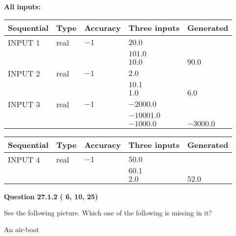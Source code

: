 \documentclass[12pt]{article}
\begin{document}
   
   
   
\noindent\vspace{0.1in}\hspace{-0.08in} {\textbf{\Large{All inputs: }}}
   
   
  
  
\noindent\begin{tabular}{|l|l|l|l|l|}
\hline
 Sequential & Type & Accuracy & Three inputs & Generated \\ 
\hline
 
 
  INPUT $           1$ & real & $          -1 $ & $
 20.0
  $ & \\
  & & &  $
 101.0
  $ & \\
  & & &  $
 10.0
 $ & $ 90.0 $ 
 \\  \hline  
 
 
  INPUT $           2$ & real & $          -1 $ & $
 2.0
  $ & \\
  & & &  $
 10.1
  $ & \\
  & & &  $
 1.0
 $ & $ 6.0 $ 
 \\  \hline  
 
 
  INPUT $           3$ & real & $          -1 $ & $
 -2000.0
  $ & \\
  & & &  $
 -10001.0
  $ & \\
  & & &  $
 -1000.0
 $ & $ -3000.0 $ 
 \\  \hline  
 \end{tabular}
   
   
  
  
\noindent\begin{tabular}{|l|l|l|l|l|}
\hline
 Sequential & Type & Accuracy & Three inputs & Generated \\ 
\hline
 
 
  INPUT $           4$ & real & $          -1 $ & $
 50.0
  $ & \\
  & & &  $
 60.1
  $ & \\
  & & &  $
 2.0
 $ & $ 52.0 $ 
 \\  \hline  
 \end{tabular}
   
   
  
\vspace{0.2in}
  
{\textbf{\Large{Question
27.1.2 
 (          6,         10,         25)
}}}
  
  
See the following picture.
Which one of the following is missing in it?
 
 
An air-boat
 
\end{document}
